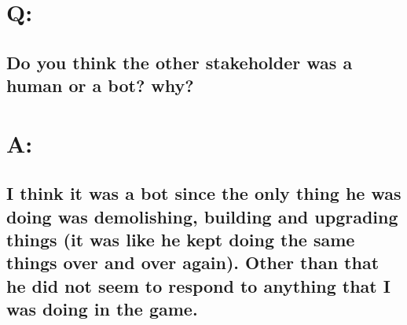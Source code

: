 \section*{Q:}
\subsection*{Do you think the other stakeholder was a human or a bot? why?}

\section*{A:}
\subsection*{I think it was a bot since the only thing he was doing was demolishing, building and upgrading things (it was like he kept doing the same things over and over again). Other than that he did not seem to respond to anything that I was doing in the game.}